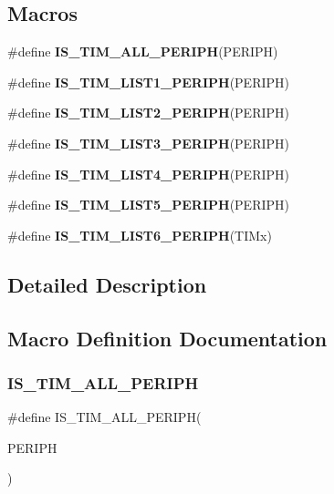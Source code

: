 \subsection*{Macros}
\begin{DoxyCompactItemize}
\item 
\#define \textbf{ I\+S\+\_\+\+T\+I\+M\+\_\+\+A\+L\+L\+\_\+\+P\+E\+R\+I\+PH}(P\+E\+R\+I\+PH)
\item 
\#define \textbf{ I\+S\+\_\+\+T\+I\+M\+\_\+\+L\+I\+S\+T1\+\_\+\+P\+E\+R\+I\+PH}(P\+E\+R\+I\+PH)
\item 
\#define \textbf{ I\+S\+\_\+\+T\+I\+M\+\_\+\+L\+I\+S\+T2\+\_\+\+P\+E\+R\+I\+PH}(P\+E\+R\+I\+PH)
\item 
\#define \textbf{ I\+S\+\_\+\+T\+I\+M\+\_\+\+L\+I\+S\+T3\+\_\+\+P\+E\+R\+I\+PH}(P\+E\+R\+I\+PH)
\item 
\#define \textbf{ I\+S\+\_\+\+T\+I\+M\+\_\+\+L\+I\+S\+T4\+\_\+\+P\+E\+R\+I\+PH}(P\+E\+R\+I\+PH)
\item 
\#define \textbf{ I\+S\+\_\+\+T\+I\+M\+\_\+\+L\+I\+S\+T5\+\_\+\+P\+E\+R\+I\+PH}(P\+E\+R\+I\+PH)
\item 
\#define \textbf{ I\+S\+\_\+\+T\+I\+M\+\_\+\+L\+I\+S\+T6\+\_\+\+P\+E\+R\+I\+PH}(T\+I\+Mx)
\end{DoxyCompactItemize}


\subsection{Detailed Description}


\subsection{Macro Definition Documentation}
\mbox{\label{group__TIM__Exported__constants_ga71710da28a59c007a1d2ddee18a5ffcc}} 
\subsubsection{I\+S\+\_\+\+T\+I\+M\+\_\+\+A\+L\+L\+\_\+\+P\+E\+R\+I\+PH}
{\footnotesize\ttfamily \#define I\+S\+\_\+\+T\+I\+M\+\_\+\+A\+L\+L\+\_\+\+P\+E\+R\+I\+PH(\begin{DoxyParamCaption}\item[{}]{P\+E\+R\+I\+PH }\end{DoxyParamCaption})}

